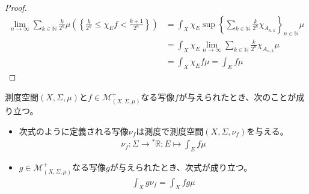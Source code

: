 \documentclass[dvipdfmx]{jsarticle}
\begin{document}
\begin{proof}
\begin{align*}
\lim_{n \rightarrow \infty}{\sum_{k \in \mathbb{N}} {\frac{k}{2^{n}}\mu\left( \left\{ \frac{k}{2^{n}} \leq \chi_{E}f < \frac{k + 1}{2^{n}} \right\} \right)}} &= \int_{X} {\chi_{E}\sup\left\{ \sum_{k \in \mathbb{N}} {\frac{k}{2^{n}}\chi_{A_{n,k}}} \right\}_{n \in \mathbb{N}}\mu}\\
&= \int_{X} {\chi_{E}\lim_{n \rightarrow \infty}{\sum_{k \in \mathbb{N}} {\frac{k}{2^{n}}\chi_{A_{n,k}}}}\mu}\\
&= \int_{X} {\chi_{E}f\mu} = \int_{E} {f\mu}
\end{align*}
\end{proof}
\begin{thm}\label{4.6.2.3}
測度空間$(X,\varSigma,\mu)$と$f \in \mathcal{M}_{(X,\varSigma,\mu)}^{+}$なる写像$f$が与えられたとき、次のことが成り立つ。
\begin{itemize}
\item
  次式のように定義される写像$\nu_{f}$は測度で測度空間$\left( X,\varSigma,\nu_{f} \right)$を与える。
\begin{align*}
\nu_{f}:\varSigma \rightarrow{}^{*}\mathbb{R};E \mapsto \int_{E} {f\mu}
\end{align*}
\item
  $g \in \mathcal{M}_{(X,\varSigma,\mu)}^{+}$なる写像$g$が与えられたとき、次式が成り立つ。
\begin{align*}
\int_{X} {g\nu_{f}} = \int_{X} {fg\mu}
\end{align*}
\end{itemize}
\end{thm}
\end{document}
